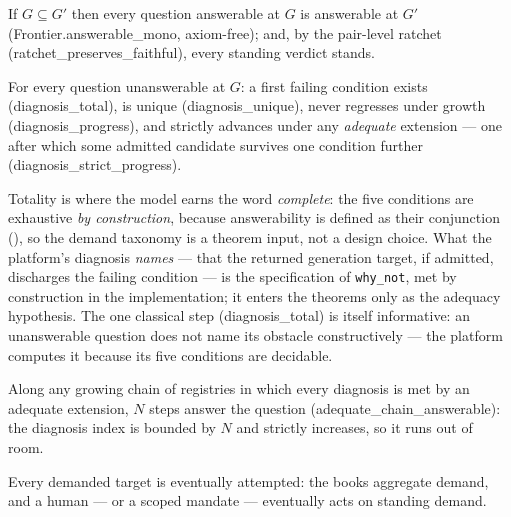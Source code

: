 \begin{theorem}
\label{thm:monotone}
If $G \subseteq G'$ then every question answerable at $G$ is
answerable at $G'$
{\normalfont(\textsf{Frontier.answerable\_mono}, axiom-free)}; and,
by the pair-level ratchet
{\normalfont(\textsf{ratchet\_preserves\_faithful})}, every standing
verdict stands.
\end{theorem}

\begin{theorem}
\label{thm:gradient}
For every question unanswerable at $G$: a first failing condition
exists {\normalfont(\textsf{diagnosis\_total})}, is unique
{\normalfont(\textsf{diagnosis\_unique})}, never regresses under
growth {\normalfont(\textsf{diagnosis\_progress})}, and strictly
advances under any \emph{adequate} extension --- one after which some
admitted candidate survives one condition further
{\normalfont(\textsf{diagnosis\_strict\_progress})}.
\end{theorem}

\noindent
Totality is where the model earns the word \emph{complete}: the five
conditions are exhaustive \emph{by construction}, because
answerability is defined as their conjunction
(), so the demand taxonomy is a theorem input,
not a design choice. What the platform's diagnosis \emph{names} ---
that the returned generation target, if admitted, discharges the
failing condition --- is the specification of \texttt{why\_not}, met
by construction in the implementation; it enters the theorems only as
the adequacy hypothesis. The one classical step
(\textsf{diagnosis\_total}) is itself informative: an unanswerable
question does not name its obstacle constructively --- the platform
computes it because its five conditions are decidable.

\begin{theorem}
\label{thm:chain}
Along any growing chain of registries in which every diagnosis is met
by an adequate extension, $N$ steps answer the question
{\normalfont(\textsf{adequate\_chain\_answerable})}: the diagnosis
index is bounded by $N$ and strictly increases, so it runs out of
room.
\end{theorem}

\begin{assumption}
\label{ass:fair}
Every demanded target is eventually attempted: the books aggregate
demand, and a human --- or a scoped mandate --- eventually acts on
standing demand.
\end{assumption}

